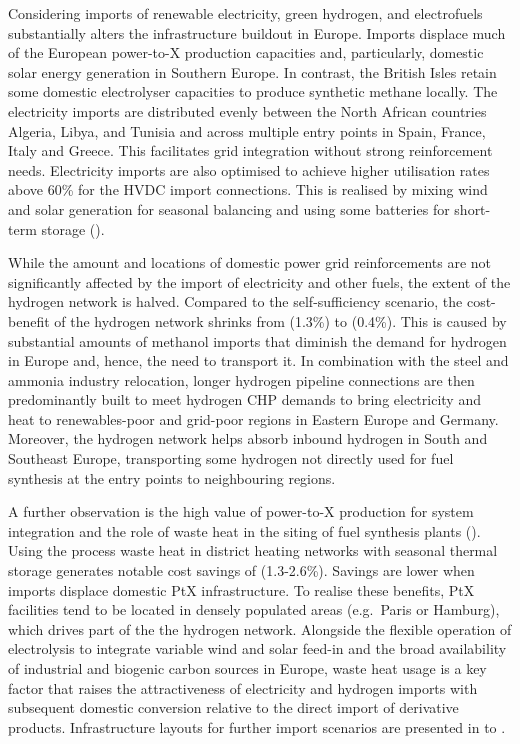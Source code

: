 
Considering imports of renewable electricity, green hydrogen, and electrofuels
substantially alters the infrastructure buildout in Europe. Imports displace
much of the European power-to-X production capacities and, particularly,
domestic solar energy generation in Southern Europe. In contrast, the British
Isles retain some domestic electrolyser capacities to produce synthetic methane
locally.
The electricity imports are distributed evenly between the North
African countries Algeria, Libya, and Tunisia and across multiple entry points
in Spain, France, Italy and Greece. This facilitates grid integration without
strong reinforcement needs. Electricity imports are also optimised to achieve
higher utilisation rates above 60\% for the HVDC import connections. This is
realised by mixing wind and solar generation for seasonal balancing and using
some batteries for short-term storage ().

While the amount and locations of domestic power grid reinforcements are not
significantly affected by the import of electricity and other fuels, the extent
of the hydrogen network is halved. Compared to the self-sufficiency scenario,
the cost-benefit of the hydrogen network shrinks from  (1.3\%) to
 (0.4\%).
This is caused by substantial amounts of methanol imports
that diminish the demand for hydrogen in Europe and, hence, the need to
transport it. In combination with the steel and ammonia industry relocation,
longer hydrogen pipeline connections are then predominantly built to meet
hydrogen CHP demands to bring electricity and heat to renewables-poor and
grid-poor regions in Eastern Europe and Germany. Moreover, the hydrogen network
helps absorb inbound hydrogen in South and Southeast Europe, transporting some
hydrogen not directly used for fuel synthesis at the entry points to
neighbouring regions. 


A further observation is the high value of power-to-X production for system
integration and the role of waste heat in the siting of fuel synthesis plants
(). Using the process waste heat in district heating
networks with seasonal thermal storage generates notable cost savings of
 (1.3-2.6\%). Savings are lower when imports displace domestic PtX
infrastructure. To realise these benefits, PtX facilities tend to be located in
densely populated areas (e.g.~Paris or Hamburg), which drives part of the the
hydrogen network. Alongside the flexible operation of electrolysis to integrate
variable wind and solar feed-in and the broad availability of industrial and
biogenic carbon sources in Europe, waste heat usage is a key factor that raises
the attractiveness of electricity and hydrogen imports with subsequent domestic
conversion relative to the direct import of derivative products. Infrastructure
layouts for further import scenarios are presented in 
to .

